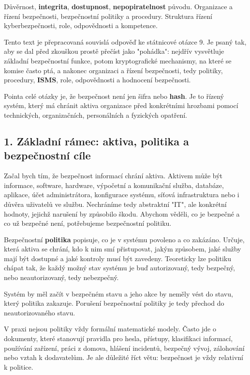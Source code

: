 \documentclass[11pt,a4paper]{article}
\begin{document}
Důvěrnost, \textbf{integrita}, \textbf{dostupnost}, \textbf{nepopiratelnost} původu. Organizace a řízení bezpečnosti, bezpečnostní politiky a procedury. Struktura řízení kyberbezpečnosti, role, odpovědnosti a kompetence.

Tento text je přepracovaná souvislá odpověď ke státnicové otázce 9. Je psaný tak, aby se dal před zkouškou prostě přečíst jako "pohádka": nejdřív vysvětluje základní bezpečnostní funkce, potom kryptografické mechanismy, na které se komise často ptá, a nakonec organizaci a řízení bezpečnosti, tedy politiky, procedury, \textbf{ISMS}, role, odpovědnosti a hodnocení bezpečnosti.

Pointa celé otázky je, že bezpečnost není jen šifra nebo \textbf{hash}. Je to řízený systém, který má chránit aktiva organizace před konkrétními hrozbami pomocí technických, organizačních, personálních a fyzických opatření.

\subsection*{1. Základní rámec: aktiva, politika a bezpečnostní cíle}

Začal bych tím, že bezpečnost informací chrání aktiva. Aktivem může být informace, software, hardware, výpočetní a komunikační služba, databáze, aplikace, účet administrátora, konfigurace systému, síťová infrastruktura nebo i důvěra uživatelů ve službu. Nechráníme tedy abstraktní "IT", ale konkrétní hodnoty, jejichž narušení by způsobilo škodu. Abychom věděli, co je bezpečné a co už bezpečné není, potřebujeme bezpečnostní politiku.

Bezpečnostní \textbf{politika} popisuje, co je v systému povoleno a co zakázáno. Určuje, která aktiva se chrání, kdo k nim smí přistupovat, jakým způsobem, jaké služby mají být dostupné a jaké kontroly musí být zavedeny. Teoreticky lze politiku chápat tak, že každý možný stav systému je buď autorizovaný, tedy bezpečný, nebo neautorizovaný, tedy nebezpečný.

Systém by měl začít v bezpečném stavu a jeho akce by neměly vést do stavu, který politika zakazuje. Porušení bezpečnostní politiky je tedy přechod do neautorizovaného stavu.

V praxi nejsou politiky vždy formální matematické modely. Často jde o dokumenty, které stanovují pravidla pro hesla, přístupy, klasifikaci informací, používání zařízení, práci z domova, hlášení incidentů, bezpečný vývoj, zálohování nebo vztah k dodavatelům. Je ale důležité říct větu: bezpečnost je vždy relativní k politice.
\end{document}
